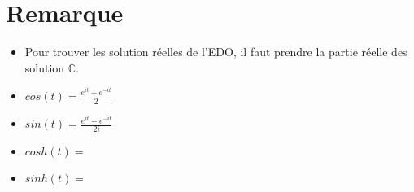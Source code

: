 \documentclass[a4paper,11pt]{report}
\begin{document}
\section{Remarque}
\begin{itemize}
\item Pour trouver les solution réelles de l'EDO, il faut prendre la partie réelle des solution $\mathbb{C}$.
\item $cos(t)=\frac{e^{it}+e^{-it}}{2}$
\item $sin(t)=\frac{e^{it}-e^{-it}}{2i}$
\item $cosh(t)=$
\item $sinh(t)=$
\end{itemize}
\end{document}
